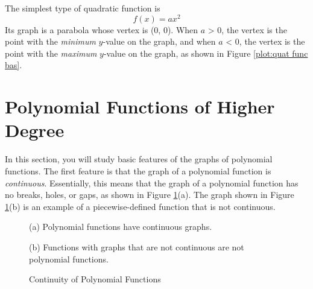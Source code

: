 The simplest type of quadratic function is
$$f(x)=ax^2$$
Its graph is a parabola whose vertex is (0, 0). When $a$ > 0, the vertex is the point with the \textit{minimum} $y$-value on the graph, and when $a$ < 0, the vertex is the point with the \textit{maximum} $y$-value on the graph, as shown in Figure \ref{plot:quat func bas}. \cite{ci}

\section{Polynomial Functions of Higher Degree}

In this section, you will study basic features of the graphs of polynomial functions. The first feature is that the graph of a polynomial function is \textit{continuous}. Essentially, this means that the graph of a polynomial function has no breaks, holes, or gaps, as shown in Figure \ref{plot:polynomials are countinuous}(a). The graph shown in Figure \ref{plot:polynomials are countinuous}(b) is an example of a piecewise-defined function that is not continuous.

\begin{figure}[H]
    \centering
    \begin{multicols}{2}
    (a) Polynomial functions have continuous graphs.
    (b) Functions with graphs that are not continuous are not polynomial functions.
\end{multicols}
    \caption{Continuity of Polynomial Functions}
    \label{plot:polynomials are countinuous}
\end{figure}

